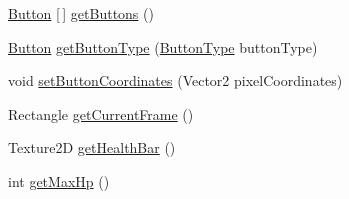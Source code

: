 \begin{DoxyCompactItemize}
\hyperlink{class_model_1_1_button}{Button} \mbox{[}$\,$\mbox{]} \hyperlink{class_model_1_1_unit_module_1_1_archer_a8306cd02babf69626ce85bed7e76d089}{get\+Buttons} ()
\item 
\hyperlink{class_model_1_1_button}{Button} \hyperlink{class_model_1_1_unit_module_1_1_archer_af4d544ecd34e57d071a129fb7d0f155d}{get\+Button\+Type} (\hyperlink{namespace_model_ac76b3489c9d704f49912608bd36cd0e7}{Button\+Type} button\+Type)
\item 
void \hyperlink{class_model_1_1_unit_module_1_1_archer_ad1e9c182bc11a0ea83134421a24c7987}{set\+Button\+Coordinates} (Vector2 pixel\+Coordinates)
\item 
Rectangle \hyperlink{class_model_1_1_unit_module_1_1_archer_ac116699a7276c0549d2be5c3998d8813}{get\+Current\+Frame} ()
\item 
Texture2D \hyperlink{class_model_1_1_unit_module_1_1_archer_a113518d26ecdbf45aca30fed1f884b3b}{get\+Health\+Bar} ()
\item 
int \hyperlink{class_model_1_1_unit_module_1_1_archer_abbb5c6501863bea35613df66a094b490}{get\+Max\+Hp} ()
\end{DoxyCompactItemize}
